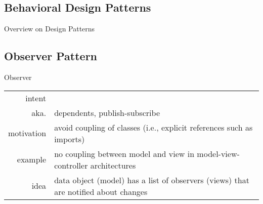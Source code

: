 \subsection{Behavioral Design Patterns}
\begin{frame}[label=behavioralpatterns]{Overview on Design Patterns \mytitlesource{\gof}}
	\centering{}
\end{frame}

\subsection{Observer Pattern}
\begin{frame}{\insertsubsection} %
	\begin{fancycolumns}
		\begin{definition}{Observer \mysource{\gof}}
			\setlength\tabcolsep{1mm}
			\begin{tabularx}{\textwidth}{rX}				
				intent & \mycite{Define a one-to-many dependency between objects so that when one object changes state, all its dependents are notified and updated automatically.}\\
				aka. & dependents, publish-subscribe\\
				motivation & avoid coupling of classes (i.e., explicit references such as imports)\\
				example & no coupling between model and view in model-view-controller architectures\\
				idea & data object (model) has a list of observers (views) that are notified about changes
			\end{tabularx}
		\end{definition}
		\nextcolumn
	\end{fancycolumns}
\end{frame}


%
